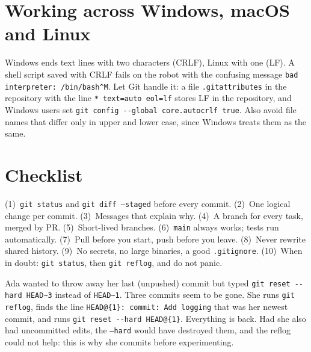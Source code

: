 \section*{Working across Windows, macOS and Linux}
Windows ends text lines with two characters (CRLF), Linux with one (LF). A shell script saved with CRLF fails on the robot with the confusing message \verb!bad interpreter: /bin/bash^M!. Let Git handle it: a file \texttt{.gitattributes} in the repository with the line \verb!* text=auto eol=lf! stores LF in the repository, and Windows users set \verb!git config --global core.autocrlf true!. Also avoid file names that differ only in upper and lower case, since Windows treats them as the same.

\section*{Checklist}
\begin{keyidea}
(1)~\texttt{git status} and \texttt{git diff --staged} before every commit. (2)~One logical change per commit. (3)~Messages that explain why. (4)~A branch for every task, merged by PR. (5)~Short-lived branches. (6)~\texttt{main} always works; tests run automatically. (7)~Pull before you start, push before you leave. (8)~Never rewrite shared history. (9)~No secrets, no large binaries, a good \texttt{.gitignore}. (10)~When in doubt: \texttt{git status}, then \texttt{git reflog}, and do not panic.
\end{keyidea}

\begin{example}
Ada wanted to throw away her last (unpushed) commit but typed \verb!git reset --hard HEAD~3! instead of \verb!HEAD~1!. Three commits seem to be gone. She runs \texttt{git reflog}, finds the line \texttt{HEAD@\{1\}: commit: Add logging} that was her newest commit, and runs \verb!git reset --hard HEAD@{1}!. Everything is back. Had she also had uncommitted edits, the \texttt{--hard} would have destroyed them, and the reflog could not help: this is why she commits before experimenting.
\end{example}

